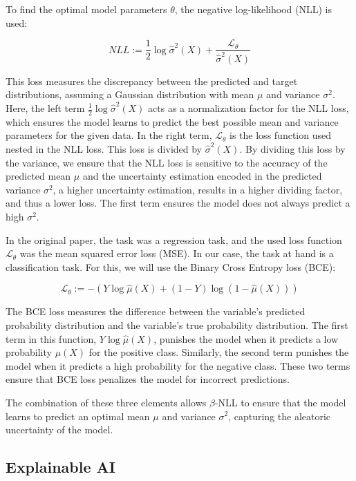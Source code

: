To find the optimal model parameters $\theta$, the negative log-likelihood (NLL) is used:

\begin{equation}
    NLL := \frac{1}{2}\log \hat{\sigma}^2(X) + \frac{\mathcal{L}_\theta}{\hat{\sigma}^2(X)}
\end{equation}

This loss measures the discrepancy between the predicted and target distributions, assuming a Gaussian distribution with mean $\mu$ and variance $\sigma^2$. Here, the left term $\frac{1}{2}\log \hat{\sigma}^2(X)$ acts as a normalization factor for the NLL loss, which ensures the model learns to predict the best possible mean and variance parameters for the given data. In the right term, $\mathcal{L}_\theta$ is the loss function used nested in the NLL loss. This loss is divided by $\hat{\sigma}^2(X)$. By dividing this loss by the variance, we ensure that the NLL loss is sensitive to the accuracy of the predicted mean $\mu$ and the uncertainty estimation encoded in the predicted variance $\sigma^2$, a higher uncertainty estimation, results in a higher dividing factor, and thus a lower loss. The first term ensures the model does not always predict a high $\sigma^2$.

In the original paper, the task was a regression task, and the used loss function $\mathcal{L}_\theta$ was the mean squared error loss (MSE). In our case, the task at hand is a classification task. For this, we will use the Binary Cross Entropy loss (BCE):

\begin{equation}
    \mathcal{L}_\theta := - ( Y \log \hat{\mu}(X) + (1 - Y) \log (1 - \hat{\mu}(X)) )
\end{equation}

The BCE loss measures the difference between the variable's predicted probability distribution and the variable's true probability distribution. The first term in this function, $Y \log \hat{\mu}(X)$, punishes the model when it predicts a low probability $\mu(X)$ for the positive class. Similarly, the second term punishes the model when it predicts a high probability for the negative class. These two terms ensure that BCE loss penalizes the model for incorrect predictions.

The combination of these three elements allows $\beta$-NLL to ensure that the model learns to predict an optimal mean $\mu$ and variance $\sigma^2$, capturing the aleatoric uncertainty of the model.


\subsection{Explainable AI}

